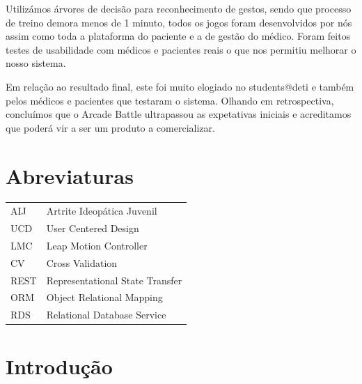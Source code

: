 \documentclass{TTUPhD}
\begin{document}
Utilizámos árvores de decisão para reconhecimento de gestos, sendo que processo de treino demora menos de 1 minuto, todos os jogos foram desenvolvidos por nós assim como toda a plataforma do paciente e a de gestão do médico. Foram feitos testes de usabilidade com médicos e pacientes reais o que nos permitiu melhorar o nosso sistema.

Em relação ao resultado final, este foi muito elogiado no students@deti e também pelos médicos e pacientes que testaram o sistema. Olhando em retrospectiva, concluímos que o Arcade Battle ultrapassou as expetativas iniciais e acreditamos que poderá vir a ser um produto a comercializar.


\section*{Abreviaturas}  %
\begin{tabular}{p{2cm} p{8cm}}
AIJ & Artrite Ideopática Juvenil \\
UCD & User Centered Design \\
LMC & Leap Motion Controller \\
CV & Cross Validation \\
REST & Representational State Transfer \\
ORM & Object Relational Mapping \\
RDS & Relational Database Service
\end{tabular}


\section{Introdução}
\end{document}
